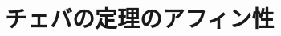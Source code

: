 \documentclass[a4paper,12pt]{bxjsbook}
\theoremstyle{theorem}
\newtheorem{definition}[theorem]{定義}
\newtheorem{example}[theorem]{例}
\begin{document}








    \section{チェバの定理のアフィン性}
\end{document}
